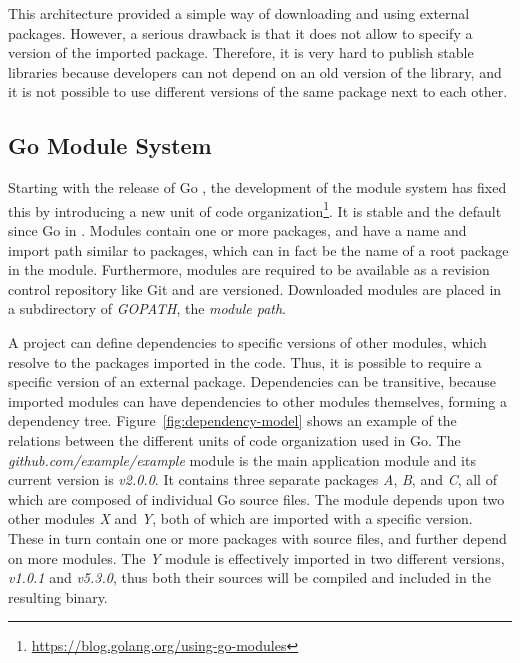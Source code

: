 This architecture provided a simple way of downloading and using external packages.
However, a serious drawback is that it does not allow to specify a version of the imported package.
Therefore, it is very hard to publish stable libraries because developers can not depend on an old version of the
library, and it is not possible to use different versions of the same package next to each other.



\subsection{Go Module System}\label{subsec:background:dependencies:modules}

Starting with the release of Go , the development of the module system has fixed this by introducing a
new unit of code organization\footnote{\url{https://blog.golang.org/using-go-modules}}.
It is stable and the default since Go  in .
Modules contain one or more packages, and have a name and import path similar to packages, which can in fact be the name
of a root package in the module.
Furthermore, modules are required to be available as a revision control repository like Git and are versioned.
Downloaded modules are placed in a subdirectory of \textit{GOPATH}, the \textit{module path}.

A project can define dependencies to specific versions of other modules, which resolve to the packages imported in the
code.
Thus, it is possible to require a specific version of an external package.
Dependencies can be transitive, because imported modules can have dependencies to other modules themselves,
forming a dependency tree.
Figure~\ref{fig:dependency-model} shows an example of the relations between the different units of code organization
used in Go.
The \textit{github.com/example/example} module is the main application module and its current version is
\textit{v2.0.0}.
It contains three separate packages \textit{A}, \textit{B}, and \textit{C}, all of which are composed of individual Go
source files.
The module depends upon two other modules \textit{X} and \textit{Y}, both of which are imported with a specific version.
These in turn contain one or more packages with source files, and further depend on more modules.
The \textit{Y} module is effectively imported in two different versions, \textit{v1.0.1} and \textit{v5.3.0}, thus both
their sources will be compiled and included in the resulting binary.

